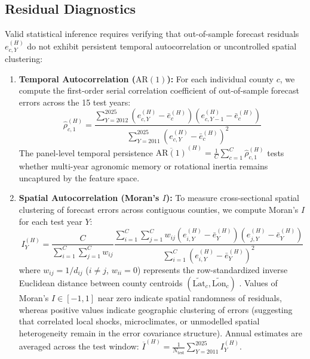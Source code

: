 \subsection{Residual Diagnostics}
\label{sec:meth_residual_diagnostics}

Valid statistical inference requires verifying that out-of-sample forecast residuals $e_{c,Y}^{(H)}$ do not exhibit persistent temporal autocorrelation or uncontrolled spatial clustering:
\begin{enumerate}
    \item \textbf{Temporal Autocorrelation ($\text{AR}(1)$):} For each individual county $c$, we compute the first-order serial correlation coefficient of out-of-sample forecast errors across the 15 test years:
    \begin{equation}
        \widehat{\rho}_{c,1}^{(H)} = \frac{\sum_{Y=2012}^{2025} (e_{c,Y}^{(H)} - \bar{e}_c^{(H)})(e_{c,Y-1}^{(H)} - \bar{e}_c^{(H)})}{\sum_{Y=2011}^{2025} (e_{c,Y}^{(H)} - \bar{e}_c^{(H)})^2}
        \label{eq:temporal_ar1}
    \end{equation}
    The panel-level temporal persistence $\overline{\text{AR}(1)}^{(H)} = \frac{1}{C}\sum_{c=1}^C \widehat{\rho}_{c,1}^{(H)}$ tests whether multi-year agronomic memory or rotational inertia remains uncaptured by the feature space.
    \item \textbf{Spatial Autocorrelation (Moran's $I$):} To measure cross-sectional spatial clustering of forecast errors across contiguous counties, we compute Moran's $I$ for each test year $Y$:
    \begin{equation}
        I_Y^{(H)} = \frac{C}{\sum_{i=1}^C \sum_{j=1}^C w_{ij}} \frac{\sum_{i=1}^C \sum_{j=1}^C w_{ij} (e_{i,Y}^{(H)} - \bar{e}_Y^{(H)})(e_{j,Y}^{(H)} - \bar{e}_Y^{(H)})}{\sum_{i=1}^C (e_{i,Y}^{(H)} - \bar{e}_Y^{(H)})^2}
        \label{eq:morans_i}
    \end{equation}
    where $w_{ij} = 1/d_{ij}$ ($i \ne j$, $w_{ii} = 0$) represents the row-standardized inverse Euclidean distance between county centroids $(\tilde{\text{Lat}}_c, \tilde{\text{Lon}}_c)$ \citep{Sweetetal2023}. Values of Moran's $I \in [-1, 1]$ near zero indicate spatial randomness of residuals, whereas positive values indicate geographic clustering of errors (suggesting that correlated local shocks, microclimates, or unmodelled spatial heterogeneity remain in the error covariance structure). Annual estimates are averaged across the test window: $\overline{I}^{(H)} = \frac{1}{N_{\text{test}}}\sum_{Y=2011}^{2025} I_Y^{(H)}$.
\end{enumerate}
